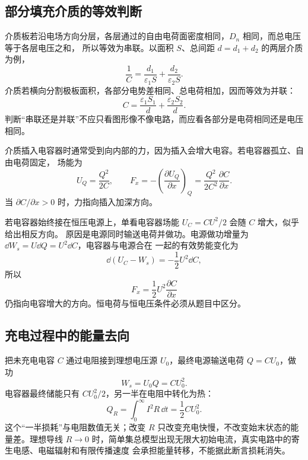 \subsection*{部分填充介质的等效判断}

介质板若沿电场方向分层，各层通过的自由电荷面密度相同，$D_n$ 相同，而总电压等于各层电压之和，
所以等效为串联。以面积 $S$、总间距 $d=d_1+d_2$ 的两层介质为例，
\begin{equation}
 \frac1C=\frac{d_1}{\varepsilon_1S}+\frac{d_2}{\varepsilon_2S}.
\end{equation}
介质若横向分割极板面积，各部分电势差相同、总电荷相加，因而等效为并联：
\begin{equation}
 C=\frac{\varepsilon_1S_1}{d}+\frac{\varepsilon_2S_2}{d}.
\end{equation}
判断“串联还是并联”不应只看图形像不像电路，而应看各部分是电荷相同还是电压相同。

介质插入电容器时通常受到向内部的力，因为插入会增大电容。若电容器孤立、自由电荷固定，
场能为
\begin{equation}
 U_Q=\frac{Q^2}{2C},
 \qquad
 F_x=-\left(\frac{\partial U_Q}{\partial x}\right)_Q
 =\frac{Q^2}{2C^2}\frac{\partial C}{\partial x}.
\end{equation}
当 $\partial C/\partial x>0$ 时，力指向插入加深方向。

若电容器始终接在恒压电源上，单看电容器场能 $U_C=CU^2/2$ 会随 $C$ 增大，似乎给出相反方向。
原因是电源同时输送电荷并做功。电源做功增量为 $\dd W_s=U\dd Q=U^2\dd C$，电容器与电源合在
一起的有效势能变化为
\begin{equation}
 \dd(U_C-W_s)=-\frac12U^2\dd C,
\end{equation}
所以
\begin{equation}
 \boxed{F_x=\frac12U^2\frac{\partial C}{\partial x}}
\end{equation}
仍指向电容增大的方向。恒电荷与恒电压条件必须从题目中区分。

\subsection*{充电过程中的能量去向}

把未充电电容 $C$ 通过电阻接到理想电压源 $U_0$，最终电源输送电荷 $Q=CU_0$，做功
\begin{equation}
 W_s=U_0Q=CU_0^2.
\end{equation}
电容器最终储能只有 $CU_0^2/2$，另一半在电阻中转化为热：
\begin{equation}
 Q_R=\int_0^\infty I^2R\,\dd t=\frac12CU_0^2.
\end{equation}
这个“一半损耗”与电阻数值无关；改变 $R$ 只改变充电快慢，不改变始末状态的能量差。理想导线
$R\to0$ 时，简单集总模型出现无限大初始电流，真实电路中的寄生电感、电磁辐射和有限传播速度
会承担能量转移，不能据此断言损耗消失。

